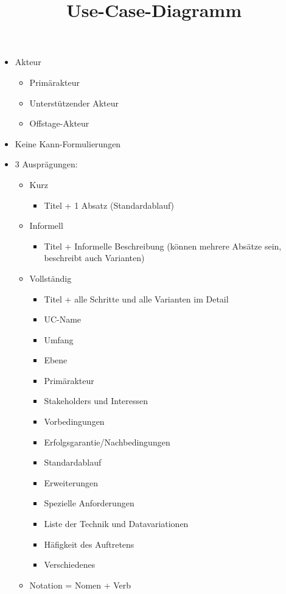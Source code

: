 \documentclass{article}
\begin{document}
\begin{itemize}
	\item Akteur
	\begin{itemize}
		\item Primärakteur
		\item Unterstützender Akteur
		\item Offstage-Akteur
	\end{itemize}
	\item Keine Kann-Formulierungen
	\item 3 Ausprägungen:
	\begin{itemize}
		\item Kurz
		\begin{itemize}
			\item Titel + 1 Absatz (Standardablauf)
		\end{itemize}
		\item Informell
		\begin{itemize}
			\item Titel + Informelle Beschreibung (können mehrere Absätze sein, beschreibt auch Varianten)
		\end{itemize}
		\item Vollständig
		\begin{itemize}
			\item Titel + alle Schritte und alle Varianten im Detail
			\item UC-Name
			\item Umfang
			\item Ebene
			\item Primärakteur
			\item Stakeholders und Interessen
			\item Vorbedingungen
			\item Erfolgsgarantie/Nachbedingungen
			\item Standardablauf
			\item Erweiterungen
			\item Spezielle Anforderungen
			\item Liste der Technik und Datavariationen
			\item Häfigkeit des Auftretens
			\item Verschiedenes
		\end{itemize}
		\item Notation = Nomen + Verb
	\end{itemize}
\end{itemize}


\title {Use-Case-Diagramm}
\end{document}
